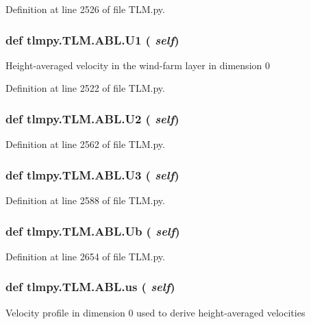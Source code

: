 Definition at line 2526 of file TLM.py.\hypertarget{classtlmpy_1_1TLM_1_1ABL_adbc1b210064c688a2dcafdf0fc30f78a}{
\subsubsection[{U1}]{\setlength{\rightskip}{0pt plus 5cm}def tlmpy.TLM.ABL.U1 ( {\em self})}}
\label{classtlmpy_1_1TLM_1_1ABL_adbc1b210064c688a2dcafdf0fc30f78a}
\begin{DoxyVerb}Height-averaged velocity in the wind-farm layer in dimension 0\end{DoxyVerb}
 

Definition at line 2522 of file TLM.py.\hypertarget{classtlmpy_1_1TLM_1_1ABL_a2342affa109635c08d4f04dfa4aacba3}{
\subsubsection[{U2}]{\setlength{\rightskip}{0pt plus 5cm}def tlmpy.TLM.ABL.U2 ( {\em self})}}
\label{classtlmpy_1_1TLM_1_1ABL_a2342affa109635c08d4f04dfa4aacba3}


Definition at line 2562 of file TLM.py.\hypertarget{classtlmpy_1_1TLM_1_1ABL_afbe49407613686a73815e5b7a44add1e}{
\subsubsection[{U3}]{\setlength{\rightskip}{0pt plus 5cm}def tlmpy.TLM.ABL.U3 ( {\em self})}}
\label{classtlmpy_1_1TLM_1_1ABL_afbe49407613686a73815e5b7a44add1e}


Definition at line 2588 of file TLM.py.\hypertarget{classtlmpy_1_1TLM_1_1ABL_ac55773fc791cd9d7cc920e22d4043623}{
\subsubsection[{Ub}]{\setlength{\rightskip}{0pt plus 5cm}def tlmpy.TLM.ABL.Ub ( {\em self})}}
\label{classtlmpy_1_1TLM_1_1ABL_ac55773fc791cd9d7cc920e22d4043623}


Definition at line 2654 of file TLM.py.\hypertarget{classtlmpy_1_1TLM_1_1ABL_a3b230b5eab0998fe08c6f50939d1798a}{
\subsubsection[{us}]{\setlength{\rightskip}{0pt plus 5cm}def tlmpy.TLM.ABL.us ( {\em self})}}
\label{classtlmpy_1_1TLM_1_1ABL_a3b230b5eab0998fe08c6f50939d1798a}
\begin{DoxyVerb}Velocity profile in dimension 0 used to derive
height-averaged velocities\end{DoxyVerb}
 

